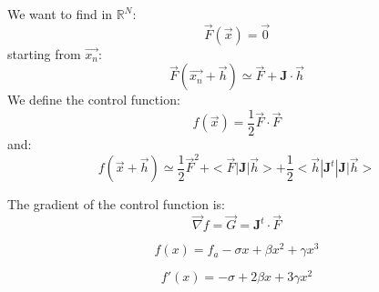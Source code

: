 \documentclass[aps,12pt]{revtex4}
\begin{document}
We want to find in $\mathbb{R}^N$:
\begin{equation}
	\vec{F}(\vec{x}) = \vec{0}
\end{equation}
starting from $\vec{x_n}$:
\begin{equation}
	\vec{F}(\vec{x_n}+\vec{h}) \simeq \vec{F} + \bm{J} \cdot \vec{h}
\end{equation}
We define the control function:
\begin{equation}
	f(\vec{x}) = \dfrac{1}{2} \vec{F} \cdot \vec{F}
\end{equation}
and:
\begin{equation}
	f(\vec{x}+\vec{h}) \simeq \dfrac{1}{2}\vec{F}^2 + <\vec{F} | \bm{J} | \vec{h} > + \dfrac{1}{2} <\vec{h}|\bm{J}^t | \bm{J} | \vec{h}>
\end{equation}

The gradient of the control function is:
\begin{equation}
	\vec{\nabla} f = \vec{G} = \bm{J}^t \cdot \vec{F}
\end{equation}


\begin{equation}
	f(x) = f_a - \sigma x + \beta x^2 + \gamma x^3
\end{equation}

\begin{equation}
	f'(x) =   - \sigma  + 2\beta x + 3\gamma x^2
\end{equation}
\end{document}
